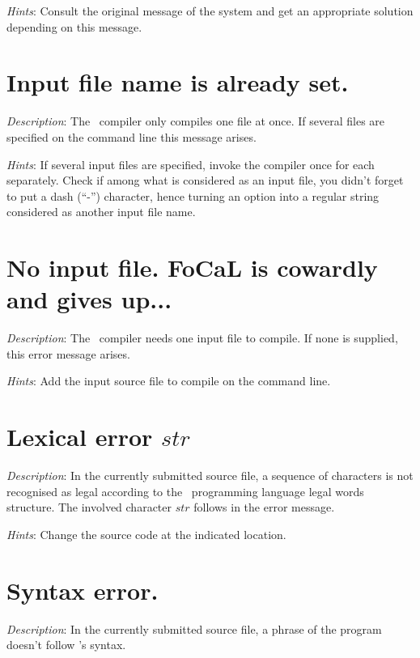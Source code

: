 {\em Hints}: Consult the original message of the system and get an
appropriate solution depending on this message.



\section*{Input file name is already set.}
{\em Description}: The \focal\ compiler only compiles one file at
once. If several files are specified on the command line this message
arises.

{\em Hints}: If several input files are specified, invoke the
compiler once for each separately. Check if among what is considered
as an input file, you didn't forget to put a dash (``-'') character,
hence turning an option into a regular string considered as another
input file name.



\section*{No input file. FoCaL is cowardly and gives up...}
{\em Description}: The \focal\ compiler needs one input file to
compile. If none is supplied, this error message arises.

{\em Hints}: Add the input source file to compile on the command
line.



\section*{Lexical error $str$}
{\em Description}: In the currently submitted source file, a sequence
of characters is not recognised as legal according to the
\focal\ programming language legal words structure. The involved
character $str$ follows in the error message.

{\em Hints}: Change the source code at the indicated location.



\section*{Syntax error.}
{\em Description}: In the currently submitted source file, a phrase of
the program doesn't follow \focal's syntax.

